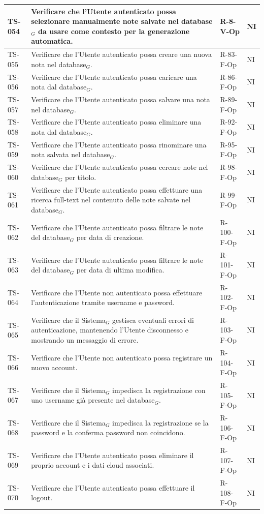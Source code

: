 \documentclass[a4paper, 10pt, colorlinks=true, linkcolor=black, urlcolor=blue, citecolor=blue, hidelinks]{article}
\begin{document}
\begin{longtable}{|p{1.4cm}|p{7.8cm}|p{2.3cm}|p{1.2cm}|}
    TS-054 & Verificare che l'Utente autenticato possa selezionare manualmente note salvate nel database$_G$ da usare come contesto per la generazione automatica. & R-8-V-Op & NI \\
    \hline
    TS-055 & Verificare che l'Utente autenticato possa creare una nuova nota nel database$_G$. & R-83-F-Op & NI \\
    \hline
    TS-056 & Verificare che l'Utente autenticato possa caricare una nota dal database$_G$. & R-86-F-Op & NI \\
    \hline
    TS-057 & Verificare che l'Utente autenticato possa salvare una nota nel database$_G$. & R-89-F-Op & NI \\
    \hline
    TS-058 & Verificare che l'Utente autenticato possa eliminare una nota dal database$_G$. & R-92-F-Op & NI \\
    \hline
    TS-059 & Verificare che l'Utente autenticato possa rinominare una nota salvata nel database$_G$. & R-95-F-Op & NI \\
    \hline
    TS-060 & Verificare che l'Utente autenticato possa cercare note nel database$_G$ per titolo. & R-98-F-Op & NI \\
    \hline
    TS-061 & Verificare che l'Utente autenticato possa effettuare una ricerca full-text nel contenuto delle note salvate nel database$_G$. & R-99-F-Op & NI \\
    \hline
    TS-062 & Verificare che l'Utente autenticato possa filtrare le note del database$_G$ per data di creazione. & R-100-F-Op & NI \\
    \hline
    TS-063 & Verificare che l'Utente autenticato possa filtrare le note del database$_G$ per data di ultima modifica. & R-101-F-Op & NI \\
    \hline
    TS-064 & Verificare che l'Utente non autenticato possa effettuare l'autenticazione tramite username e password. & R-102-F-Op & NI \\
    \hline
    TS-065 & Verificare che il Sistema$_G$ gestisca eventuali errori di autenticazione, mantenendo l'Utente disconnesso e mostrando un messaggio di errore. & R-103-F-Op & NI \\
    \hline
    TS-066 & Verificare che l'Utente non autenticato possa registrare un nuovo account. & R-104-F-Op & NI \\
    \hline
    TS-067 & Verificare che il Sistema$_G$ impedisca la registrazione con uno username già presente nel database$_G$. & R-105-F-Op & NI \\
    \hline
    TS-068 & Verificare che il Sistema$_G$ impedisca la registrazione se la password e la conferma password non coincidono. & R-106-F-Op & NI \\
    \hline
    TS-069 & Verificare che l'Utente autenticato possa eliminare il proprio account e i dati cloud associati. & R-107-F-Op & NI \\
    \hline
    TS-070 & Verificare che l'Utente autenticato possa effettuare il logout. & R-108-F-Op & NI \\
    \hline


\end{longtable}
\end{document}
